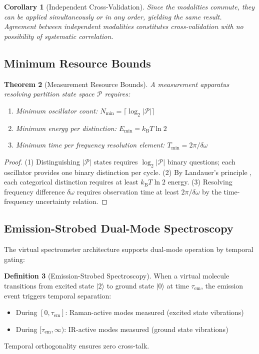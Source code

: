 \documentclass[11pt,a4paper]{article}
\newtheorem{theorem}{Theorem}[section]
\newtheorem{corollary}[theorem]{Corollary}
\theoremstyle{definition}
\newtheorem{definition}[theorem]{Definition}
\theoremstyle{remark}
\newcommand{\kB}{k_{\mathrm{B}}}
\begin{document}
\begin{corollary}[Independent Cross-Validation]
Since the modalities commute, they can be applied simultaneously or in any order, yielding the same result. Agreement between independent modalities constitutes cross-validation with no possibility of systematic correlation.
\end{corollary}

\subsection{Minimum Resource Bounds}

\begin{theorem}[Measurement Resource Bounds]
\label{thm:bounds}
A measurement apparatus resolving partition state space $\mathcal{P}$ requires:
\begin{enumerate}
\item Minimum oscillator count: $N_{\min} = \lceil \log_2 |\mathcal{P}| \rceil$
\item Minimum energy per distinction: $E_{\min} = \kB T \ln 2$ \citep{landauer1961}
\item Minimum time per frequency resolution element: $T_{\min} = 2\pi / \delta\omega$
\end{enumerate}
\end{theorem}

\begin{proof}
(1) Distinguishing $|\mathcal{P}|$ states requires $\log_2 |\mathcal{P}|$ binary questions; each oscillator provides one binary distinction per cycle.
(2) By Landauer's principle \citep{landauer1961}, each categorical distinction requires at least $\kB T \ln 2$ energy.
(3) Resolving frequency difference $\delta\omega$ requires observation time at least $2\pi/\delta\omega$ by the time-frequency uncertainty relation.
\end{proof}

\subsection{Emission-Strobed Dual-Mode Spectroscopy}

The virtual spectrometer architecture supports dual-mode operation by temporal gating:

\begin{definition}[Emission-Strobed Spectroscopy]
When a virtual molecule transitions from excited state $|2\rangle$ to ground state $|0\rangle$ at time $\tau_{\mathrm{em}}$, the emission event triggers temporal separation:
\begin{itemize}[nosep]
\item During $[0, \tau_{\mathrm{em}}]$: Raman-active modes measured (excited state vibrations)
\item During $[\tau_{\mathrm{em}}, \infty)$: IR-active modes measured (ground state vibrations)
\end{itemize}
Temporal orthogonality ensures zero cross-talk.
\end{definition}
\end{document}

